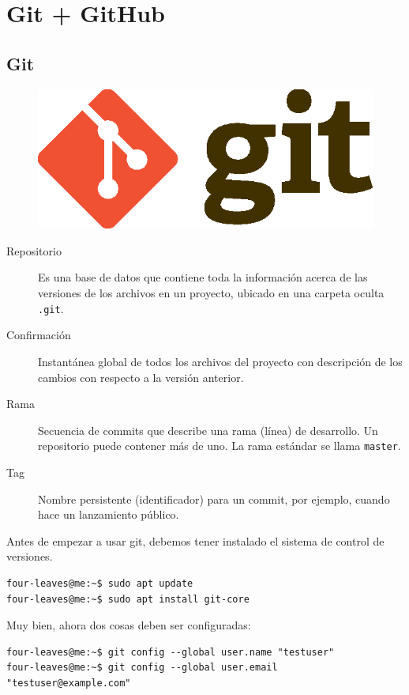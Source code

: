 \chapter{Git + GitHub}

\section{Git}

\lipsum[1]
\begin{figure}
	\includegraphics[width=0.24\paperwidth]{./img/git}
\end{figure}
\lipsum[1]

\begin{description}
	\item[Repositorio] Es una base de datos que contiene toda la información acerca de las versiones de los archivos en un proyecto, ubicado en una carpeta oculta \texttt{.git}.
	\item[Confirmación] Instantánea global de todos los archivos del proyecto con descripción de los cambios con respecto a la versión anterior.
	\item[Rama] Secuencia de commits que describe una rama (línea) de desarrollo. Un repositorio puede contener más de uno. La rama estándar se llama \texttt{master}.
	\item[Tag] Nombre persistente (identificador) para un commit, por ejemplo, cuando hace un lanzamiento público.
\end{description}

Antes de empezar a usar git, debemos tener instalado el sistema de control de versiones.

\begin{verbatim}
four-leaves@me:~$ sudo apt update
four-leaves@me:~$ sudo apt install git-core
\end{verbatim}

Muy bien, ahora dos cosas deben ser configuradas:
\begin{verbatim}
four-leaves@me:~$ git config --global user.name "testuser"
four-leaves@me:~$ git config --global user.email "testuser@example.com"
\end{verbatim}

